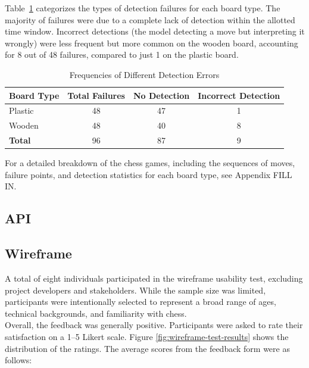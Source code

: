 Table~\ref{tab:different-errors} categorizes the types of detection failures for each board type. The majority of failures were due to a complete lack of detection within the allotted time window. Incorrect detections (the model detecting a move but interpreting it wrongly) were less frequent but more common on the wooden board, accounting for 8 out of 48 failures, compared to just 1 on the plastic board.  \\

\begin{table}[htbp]
\centering
\caption[Different detection errors]{Frequencies of Different Detection Errors}
\label{tab:different-errors}
\begin{tabular}{lccc}
\toprule
\textbf{Board Type} & \textbf{Total Failures} & \textbf{No Detection} & \textbf{Incorrect Detection} \\
\midrule
Plastic & 48 & 47 & 1 \\
Wooden & 48 & 40 & 8 \\
\midrule
\textbf{Total} & 96 & 87 & 9 \\
\bottomrule
\end{tabular}
\end{table}

For a detailed breakdown of the chess games, including the sequences of moves, failure points, and detection statistics for each board type, see Appendix FILL IN.

\subsection{API}

\subsection{Wireframe}
\label{subsec:wireframe-results}

A total of eight individuals participated in the wireframe usability test, excluding project developers and stakeholders. While the sample size was limited, participants were intentionally selected to represent a broad range of ages, technical backgrounds, and familiarity with chess. \\

Overall, the feedback was generally positive. Participants were asked to rate their satisfaction on a 1–5 Likert scale. Figure \ref{fig:wireframe-test-results} shows the distribution of the ratings. The average scores from the feedback form were as follows:

